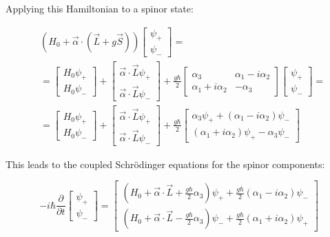 \documentclass[italian]{HKNdocument}
\begin{document}
Applying this Hamiltonian to a spinor state:

\begin{align}
& \left(H_{0}+\vec{\alpha} \cdot(\vec{L}+g \vec{S})\right)\left[\begin{array}{l}
\psi_{+} \\
\psi_{-}
\end{array}\right]= \\
& =\left[\begin{array}{l}
H_{0} \psi_{+} \\
H_{0} \psi_{-}
\end{array}\right]+\left[\begin{array}{l}
\vec{\alpha} \cdot \vec{L} \psi_{+} \\
\vec{\alpha} \cdot \vec{L} \psi_{-}
\end{array}\right]+\frac{g \hbar}{2}\left[\begin{array}{cc}
\alpha_{3} & \alpha_{1}-i \alpha_{2} \\
\alpha_{1}+i \alpha_{2} & -\alpha_{3}
\end{array}\right]\left[\begin{array}{l}
\psi_{+} \\
\psi_{-}
\end{array}\right]=  \\
& =\left[\begin{array}{l}
H_{0} \psi_{+} \\
H_{0} \psi_{-}
\end{array}\right]+\left[\begin{array}{l}
\vec{\alpha} \cdot \vec{L} \psi_{+} \\
\vec{\alpha} \cdot \vec{L} \psi_{-}
\end{array}\right]+\frac{g \hbar}{2}\left[\begin{array}{l}
\alpha_{3} \psi_{+}+\left(\alpha_{1}-i \alpha_{2}\right) \psi_{-} \\
\left(\alpha_{1}+i \alpha_{2}\right) \psi_{+}-\alpha_{3} \psi_{-}
\end{array}\right]
\end{align}

This leads to the coupled Schrödinger equations for the spinor components:

\[
-i \hbar \frac{\partial}{\partial t}\left[\begin{array}{l}
\psi_{+}  \\
\psi_{-}
\end{array}\right]=\left[\begin{array}{l}
\left(H_{0}+\vec{\alpha} \cdot \vec{L}+\frac{g\hbar}{2}\alpha_{3}\right) \psi_{+}+\frac{g\hbar}{2}\left(\alpha_{1}-i \alpha_{2}\right) \psi_{-} \\
\left(H_{0}+\vec{\alpha} \cdot \vec{L}-\frac{g\hbar}{2}\alpha_{3}\right) \psi_{-}+\frac{g\hbar}{2}\left(\alpha_{1}+i \alpha_{2}\right) \psi_{+}
\end{array}\right]
\]
\end{document}

